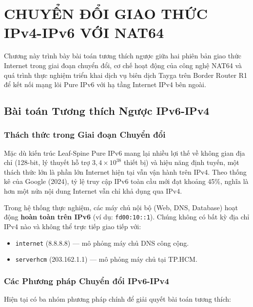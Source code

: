 \section{CHUYỂN ĐỔI GIAO THỨC IPv4-IPv6 VỚI NAT64}\label{sec:nat64}

Chương này trình bày bài toán tương thích ngược giữa hai phiên bản giao thức Internet trong giai đoạn chuyển đổi, cơ chế hoạt động của công nghệ NAT64 và quá trình thực nghiệm triển khai dịch vụ biên dịch Tayga trên Border Router R1 để kết nối mạng lõi Pure IPv6 với hạ tầng Internet IPv4 bên ngoài.

\subsection{Bài toán Tương thích Ngược IPv6-IPv4}

\subsubsection{Thách thức trong Giai đoạn Chuyển đổi}

Mặc dù kiến trúc Leaf-Spine Pure IPv6 mang lại nhiều lợi thế về không gian địa chỉ (128-bit, lý thuyết hỗ trợ $3,4 \times 10^{38}$ thiết bị) và hiệu năng định tuyến, một thách thức lớn là phần lớn Internet hiện tại vẫn vận hành trên IPv4. Theo thống kê của Google (2024), tỷ lệ truy cập IPv6 toàn cầu mới đạt khoảng 45\%, nghĩa là hơn một nửa nội dung Internet vẫn chỉ khả dụng qua IPv4.

Trong hệ thống thực nghiệm, các máy chủ nội bộ (Web, DNS, Database) hoạt động \textbf{hoàn toàn trên IPv6} (ví dụ: \texttt{fd00:10::1}). Chúng không có bất kỳ địa chỉ IPv4 nào và không thể trực tiếp giao tiếp với:
\begin{itemize}
    \item \texttt{internet} (8.8.8.8) — mô phỏng máy chủ DNS công cộng.
    \item \texttt{serverhcm} (203.162.1.1) — mô phỏng máy chủ tại TP.HCM.
\end{itemize}

\subsubsection{Các Phương pháp Chuyển đổi IPv6-IPv4}

Hiện tại có ba nhóm phương pháp chính để giải quyết bài toán tương thích:


